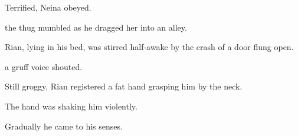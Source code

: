 Terrified, Neina obeyed. 


 the thug mumbled as he dragged her into an alley. 








\begin{comment}
\section{Rian and Rod Baker}
\end{comment}
\new
{}
Rian, lying in his bed, was stirred half-awake by the crash of a door flung open. 

 a gruff voice shouted. 

Still groggy, Rian registered a fat hand grasping him by the neck. 

The hand was shaking him violently. 

Gradually he came to his senses. 

